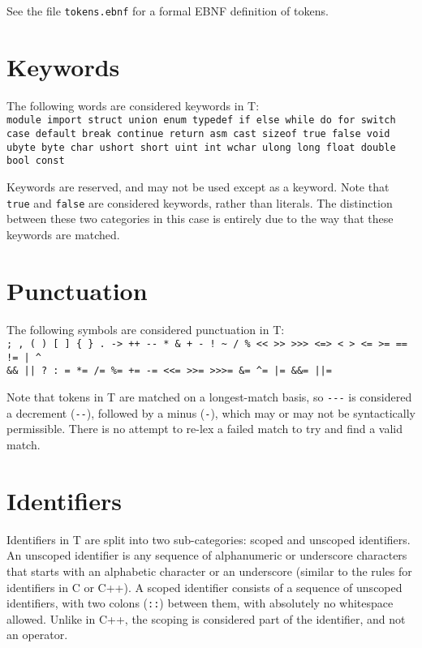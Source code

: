\documentclass[letterpaper,12pt]{book}
\begin{document}
See the file \texttt{tokens.ebnf} for a formal EBNF definition of tokens.

\section{Keywords}

The following words are considered keywords in T:\texttt{\\
module import struct union enum typedef if else while do for switch case default break continue return asm cast sizeof true false void ubyte byte char ushort short uint int wchar ulong long float double bool const}

Keywords are reserved, and may not be used except as a keyword. Note that \texttt{true} and \texttt{false} are considered keywords, rather than literals. The distinction between these two categories in this case is entirely due to the way that these keywords are matched.

\section{Punctuation}

The following symbols are considered punctuation in T:\\
\verb$; , ( ) [ ] { } . -> ++ -- * & + - ! ~ / % << >> >>> <=> < > <= >= == != | ^$\\\verb$&& || ? : = *= /= %= += -= <<= >>= >>>= &= ^= |= &&= ||=$

Note that tokens in T are matched on a longest-match basis, so \verb|---| is considered a decrement (\verb|--|), followed by a minus (\verb|-|), which may or may not be syntactically permissible. There is no attempt to re-lex a failed match to try and find a valid match.

\section{Identifiers}

Identifiers in T are split into two sub-categories: scoped and unscoped identifiers. An unscoped identifier is any sequence of alphanumeric or underscore characters that starts with an alphabetic character or an underscore (similar to the rules for identifiers in C or C++). A scoped identifier consists of a sequence of unscoped identifiers, with two colons (\verb|::|) between them, with absolutely no whitespace allowed. Unlike in C++, the scoping is considered part of the identifier, and not an operator.
\end{document}
